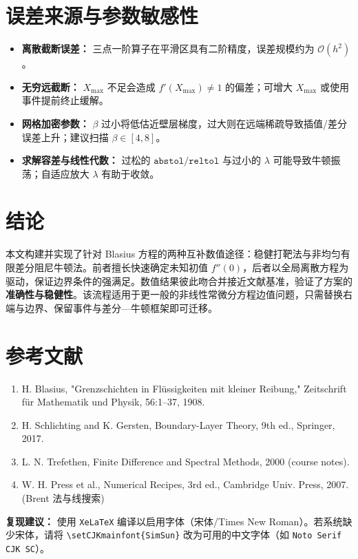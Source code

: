 \documentclass[12pt]{article}
\begin{document}
\section{误差来源与参数敏感性}
\begin{itemize}[leftmargin=2em]
  \item \textbf{离散截断误差：} 三点一阶算子在平滑区具有二阶精度，误差规模约为 \(\mathcal{O}(h^2)\)。
  \item \textbf{无穷远截断：} \(X_{\max}\) 不足会造成 \(f'(X_{\max})\neq 1\) 的偏差；可增大 \(X_{\max}\) 或使用事件提前终止缓解。
  \item \textbf{网格加密参数：} \(\beta\) 过小将低估近壁层梯度，过大则在远端稀疏导致插值/差分误差上升；建议扫描 \(\beta\in[4,8]\)。
  \item \textbf{求解容差与线性代数：} 过松的 \(\texttt{abstol/reltol}\) 与过小的 \(\lambda\) 可能导致牛顿振荡；自适应放大 \(\lambda\) 有助于收敛。
\end{itemize}

\section{结论}
本文构建并实现了针对 Blasius 方程的两种互补数值途径：稳健打靶法与非均匀有限差分阻尼牛顿法。前者擅长快速确定未知初值 \(f''(0)\)，后者以全局离散方程为驱动，保证边界条件的强满足。数值结果彼此吻合并接近文献基准，验证了方案的\textbf{准确性与稳健性}。该流程适用于更一般的非线性常微分方程边值问题，只需替换右端与边界、保留事件与差分—牛顿框架即可迁移。

\section*{参考文献}
\begin{enumerate}[leftmargin=2em]
  \item H. Blasius, "Grenzschichten in Flüssigkeiten mit kleiner Reibung," Zeitschrift für Mathematik und Physik, 56:1–37, 1908.
  \item H. Schlichting and K. Gersten, Boundary-Layer Theory, 9th ed., Springer, 2017.
  \item L. N. Trefethen, Finite Difference and Spectral Methods, 2000 (course notes).
  \item W. H. Press et al., Numerical Recipes, 3rd ed., Cambridge Univ. Press, 2007. (Brent 法与线搜索)
\end{enumerate}

\vspace{1em}
\noindent\textbf{复现建议：} 使用 \texttt{XeLaTeX} 编译以启用字体（宋体/Times New Roman）。若系统缺少宋体，请将 \verb|\setCJKmainfont{SimSun}| 改为可用的中文字体（如 \verb|Noto Serif CJK SC|）。
\end{document}
